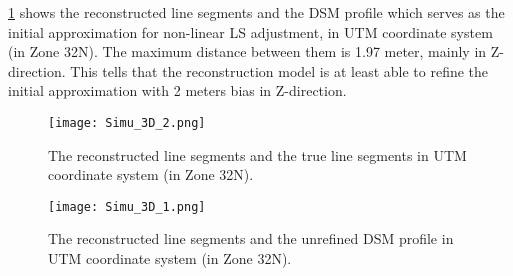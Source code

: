 \cref{fig:Simu3D_1} shows the reconstructed line segments and the DSM profile which serves as the initial approximation for non-linear LS adjustment, in UTM coordinate system (in Zone 32N). The maximum distance between them is 1.97 meter, mainly in Z-direction. This tells that {the reconstruction model is at least able to refine the initial approximation with 2 meters bias in Z-direction}.

\begin{figure}
  \centering
  \texttt{[image: Simu\_3D\_2.png]} %
  \caption{\small The reconstructed line segments and the true line segments in UTM coordinate system (in Zone 32N).}
  \label{fig:Simu3D_2}
  \vspace{1cm}
  \centering
  \texttt{[image: Simu\_3D\_1.png]}
  \caption{\small The reconstructed line segments and the unrefined DSM profile in UTM coordinate system (in Zone 32N).}
  \label{fig:Simu3D_1}
\end{figure}

\clearpage







